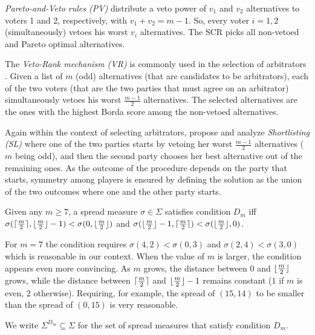 \documentclass[version=3.21, pagesize, twoside=off, bibliography=totoc, DIV=calc, fontsize=12pt, a4paper]{scrartcl}
\begin{document}
\textit{Pareto-and-Veto rules (PV)} \citep{Laslier2020} distribute a veto power of $v_1$ and $v_2$ alternatives to voters 1 and 2, respectively, with $v_1+v_2=m-1$. So, every voter $i=1,2$ (simultaneously) vetoes his worst $v_i$ alternatives. The \ac{SCR} picks all non-vetoed and Pareto optimal alternatives.

The \textit{Veto-Rank mechanism (VR)} is commonly used in the selection of arbitrators \citep{Clippel2014}. Given a list of $m$ (odd) alternatives (that are candidates to be arbitrators), each of the two voters (that are the two parties that must agree on an arbitrator) simultaneously vetoes his worst $\frac{m-1}{2}$ alternatives. The selected alternatives are the ones with the highest Borda score among the non-vetoed alternatives.

Again within the context of selecting arbitrators, \citet{Clippel2014} propose and analyze \textit{Shortlisting (SL)} where one of the two parties starts by vetoing her worst $\frac{m-1}{2}$ alternatives ($m$ being odd), and then the second party chooses her best alternative out of the remaining ones. As the outcome of the procedure depends on the party that starts, symmetry among players is ensured by defining the solution as the union of the two outcomes where one and the other party starts.


\begin{definition}
    Given any $m \geq 7$, a spread measure $\sigma \in \Sigma$ satisfies condition $D_m$ iff 
    $\sigma(\lceil\frac{m}{2}\rceil, \lfloor\frac{m}{2}\rfloor - 1) < \sigma(0, \lfloor\frac{m}{2}\rfloor)$ and 
    $\sigma(\lfloor\frac{m}{2}\rfloor - 1, \lceil\frac{m}{2}\rceil) < \sigma(\lfloor\frac{m}{2}\rfloor, 0)$.
\end{definition}
For $m=7$ the condition requires $\sigma(4,2) < \sigma(0,3)$ and $\sigma(2,4) < \sigma(3,0)$ which is reasonable in our context.  When the value of $m$ is larger, the condition appears even more convincing. As $m$ grows, the distance between $0$ and $\lfloor\frac{m}{2}\rfloor$ grows, while the distance between $\lceil\frac{m}{2}\rceil$ and $\lfloor\frac{m}{2}\rfloor - 1$ remains constant ($1$ if $m$ is even, $2$ otherwise). Requiring, for example, the spread of $(15,14)$ to be smaller than the spread of $(0,15)$ is very reasonable.

We write $\Sigma^{D_{m}} \subseteq \Sigma$ for the set of spread measures that satisfy condition $D_{m}$. 
\end{document}

